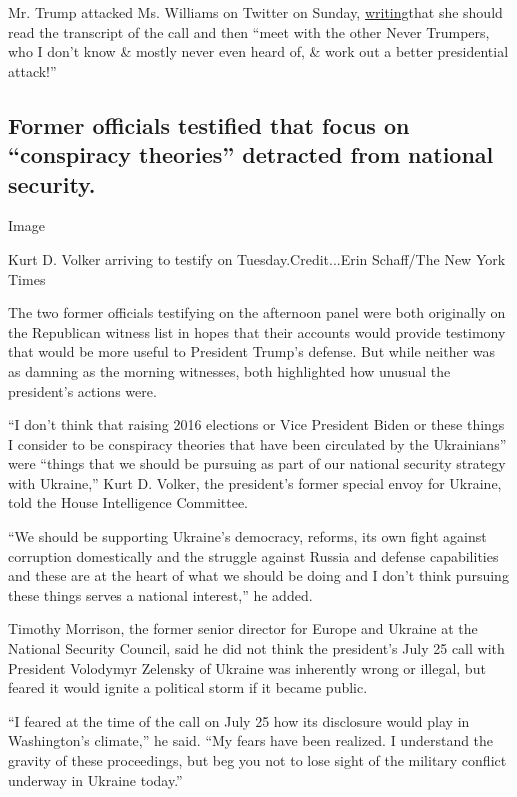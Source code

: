 Mr. Trump attacked Ms. Williams on Twitter on Sunday,
\href{https://twitter.com/realDonaldTrump/status/1196155347117002752?s=20}{writing}that
she should read the transcript of the call and then ``meet with the
other Never Trumpers, who I don't know \& mostly never even heard of, \&
work out a better presidential attack!''

\hypertarget{former-officials-testified-that-focus-on-conspiracy-theories-detracted-from-national-security}{%
\subsection{Former officials testified that focus on ``conspiracy
theories'' detracted from national
security.}\label{former-officials-testified-that-focus-on-conspiracy-theories-detracted-from-national-security}}

Image

Kurt D. Volker arriving to testify on Tuesday.Credit...Erin Schaff/The
New York Times

The two former officials testifying on the afternoon panel were both
originally on the Republican witness list in hopes that their accounts
would provide testimony that would be more useful to President Trump's
defense. But while neither was as damning as the morning witnesses, both
highlighted how unusual the president's actions were.

``I don't think that raising 2016 elections or Vice President Biden or
these things I consider to be conspiracy theories that have been
circulated by the Ukrainians'' were ``things that we should be pursuing
as part of our national security strategy with Ukraine,'' Kurt D.
Volker, the president's former special envoy for Ukraine, told the House
Intelligence Committee.

``We should be supporting Ukraine's democracy, reforms, its own fight
against corruption domestically and the struggle against Russia and
defense capabilities and these are at the heart of what we should be
doing and I don't think pursuing these things serves a national
interest,'' he added.

Timothy Morrison, the former senior director for Europe and Ukraine at
the National Security Council, said he did not think the president's
July 25 call with President Volodymyr Zelensky of Ukraine was inherently
wrong or illegal, but feared it would ignite a political storm if it
became public.

``I feared at the time of the call on July 25 how its disclosure would
play in Washington's climate,'' he said. ``My fears have been realized.
I understand the gravity of these proceedings, but beg you not to lose
sight of the military conflict underway in Ukraine today.''

